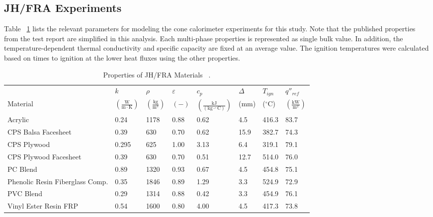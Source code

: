 \subsection{JH/FRA Experiments}\label{sec_JH_FRA_Materials}

Table ~\ref{Properties_JH_FRA_Materials} lists the relevant parameters for modeling the cone calorimeter experiments for this study.
Note that the published properties from the test report are simplified in this analysis. Each multi-phase properties is represented as single bulk value. 
In addition, the temperature-dependent thermal conductivity and specific capacity are fixed at an average value. 
The ignition temperatures were calculated based on times to ignition at the lower heat fluxes using the other properties.

\begin{table}[!h]
\caption[Properties of JH/FRA Materials]{Properties of JH/FRA Materials ~\cite{Luo:FRA2019}.}
\centering
\begin{tabular}{|p{5.5cm}|p{1.0cm}|p{1.0cm}|p{0.8cm}|p{1.4cm}|p{1.0cm}|p{1.0cm}|p{1.2cm}|}
\hline
                                               & $k$    & $\rho$      & $\varepsilon$   & $c_{p}$ & $\Delta$    & $T_{ign}$ & $q''_{ref}$ \\
Material                                       & $\mathrm{\left(\frac{W}{m\cdot K}\right)}$ & $\mathrm{\left(\frac{kg}{m^{3}}\right)}$ & $\mathrm{( - )}$ & $\mathrm{\left(\frac{kJ}{(kg\cdot ^{\circ}C)}\right)}$ &  ($\mathrm{mm}$)   & ($\mathrm{^{\circ}C}$) & $\mathrm{\left(\frac{kW}{m^{2}}\right)}$ \\ \hline
\hline
Acrylic & 0.24 & 1178 & 0.88 & 0.62 & 4.5 & 416.3 & 83.7 \\ \hline 
CPS Balsa Facesheet & 0.39 & 630 & 0.70 & 0.62 & 15.9 & 382.7 & 74.3 \\ \hline 
CPS Plywood & 0.295 & 625 & 1.00 & 3.13 & 6.4 & 319.1 & 79.1 \\ \hline 
CPS Plywood Facesheet & 0.39 & 630 & 0.70 & 0.51 & 12.7 & 514.0 & 76.0 \\ \hline 
PC Blend & 0.89 & 1320 & 0.93 & 0.67 & 4.5 & 454.8 & 75.1 \\ \hline 
Phenolic Resin Fiberglass Comp. & 0.35 & 1846 & 0.89 & 1.29 & 3.3 & 524.9 & 72.9 \\ \hline 
PVC Blend & 0.29 & 1314 & 0.88 & 0.42 & 3.3 & 454.9 & 76.1 \\ \hline 
Vinyl Ester Resin FRP & 0.54 & 1600 & 0.80 & 4.00 & 4.5 & 417.3 & 73.8 \\ \hline 
\end{tabular}
\label{Properties_JH_FRA_Materials}
\end{table}

